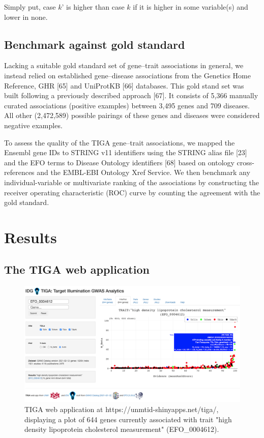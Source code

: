 Simply put, case $k’$ is higher than case $k$ if it is higher in some variable(s) and lower in none.

\subsection{Benchmark against gold standard}

Lacking a suitable gold standard set of gene–trait associations in general, we instead relied on established gene–disease associations from the Genetics Home Reference, GHR [65] and UniProtKB [66] databases. This gold stand set was built following a previously described approach [67]. It consists of 5,366 manually curated associations (positive examples) between 3,495 genes and 709 diseases. All other (2,472,589) possible pairings of these genes and diseases were considered negative examples.

To assess the quality of the TIGA gene–trait associations, we mapped the Ensembl gene IDs to STRING v11 identifiers using the STRING alias file [23] and the EFO terms to Disease Ontology identifiers [68] based on ontology cross-references and the EMBL-EBI Ontology Xref Service. We then benchmark any individual-variable or multivariate ranking of the associations by constructing the receiver operating characteristic (ROC) curve by counting the agreement with the gold standard.

\section{Results}

\subsection{The TIGA web application}

\begin{figure}
	\includegraphics[width=\textwidth]{figures/tiga/FIG03_TIGA_EFO_0004612_plot.png}
	\caption{TIGA web application at https://unmtid-shinyapps.net/tiga/, displaying a plot of 644 genes currently associated with trait "high density lipoprotein cholesterol measurement" (EFO\_0004612).}
	\label{fig:TIGA_app}
\end{figure}

